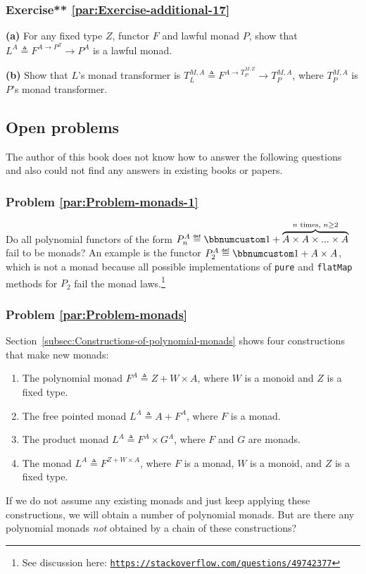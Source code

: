\subsubsection{Exercise{*}{*} \label{par:Exercise-additional-17}\ref{par:Exercise-additional-17}}

\textbf{(a)} For any fixed type $Z$, functor $F$ and lawful monad
$P$, show that $L^{A}\triangleq F^{A\rightarrow P^{Z}}\rightarrow P^{A}$
is a lawful monad.

\textbf{(b)} Show that $L$\textsf{'}s monad transformer is $T_{L}^{M,A}\triangleq F^{A\rightarrow T_{P}^{M,Z}}\rightarrow T_{P}^{M,A}$,
where $T_{P}^{M,A}$ is $P$\textsf{'}s monad transformer.

\subsection{Open problems}

The author of this book does not know how to answer the following
questions and also could not find any answers in existing books or
papers.

\subsubsection{Problem \label{par:Problem-monads-1}\ref{par:Problem-monads-1}}

Do all polynomial functors of the form $P_{n}^{A}\triangleq\bbnum 1+\overbrace{A\times A\times...\times A}^{n\text{ times, }n\ge2}$
fail to be monads? An example is the functor $P_{2}^{A}\triangleq\bbnum 1+A\times A$,
which is not a monad because all possible implementations of \lstinline!pure!
and \lstinline!flatMap! methods for $P_{2}$ fail the monad laws.\footnote{See discussion here: \texttt{\href{https://stackoverflow.com/questions/49742377}{https://stackoverflow.com/questions/49742377}}}

\subsubsection{Problem \label{par:Problem-monads}\ref{par:Problem-monads}}

Section~\ref{subsec:Constructions-of-polynomial-monads} shows four
constructions that make new monads:
\begin{enumerate}
\item The polynomial monad $F^{A}\triangleq Z+W\times A$, where $W$ is
a monoid and $Z$ is a fixed type.
\item The free pointed monad $L^{A}\triangleq A+F^{A}$, where $F$ is a
monad.
\item The product monad $L^{A}\triangleq F^{A}\times G^{A}$, where $F$
and $G$ are monads.
\item The monad $L^{A}\triangleq F^{Z+W\times A}$, where $F$ is a monad,
$W$ is a monoid, and $Z$ is a fixed type.
\end{enumerate}
If we do not assume any existing monads and just keep applying these
constructions, we will obtain a number of polynomial monads. But are
there any polynomial monads \emph{not} obtained by a chain of these
constructions?


